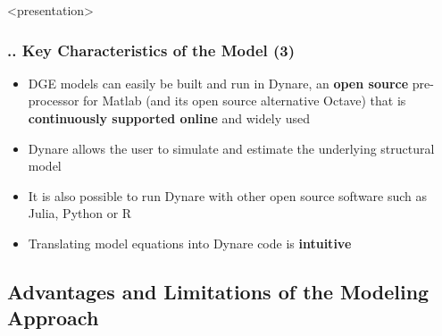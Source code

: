 \documentclass[11pt,aspectratio=169]{beamer}
\begin{document}
   
\begin{frame}<presentation>
	\frametitle{{\thesection.\thesubsection.\thesubsubsection} Key Characteristics of the Model (3)}
	\begin{itemize}
		\item DGE models can easily be built and run in Dynare, an \textbf{open source} pre-processor for Matlab (and its open source alternative Octave) that is \textbf{continuously supported online} and widely used
\item	Dynare allows the user to simulate and estimate the underlying structural model
\item It is also possible to run Dynare with other open source software such as Julia, Python or R
\item Translating model equations into Dynare code is \textbf{intuitive}  
\end{itemize}
\end{frame}

\subsection{Advantages and Limitations of the Modeling Approach}
\end{document}
